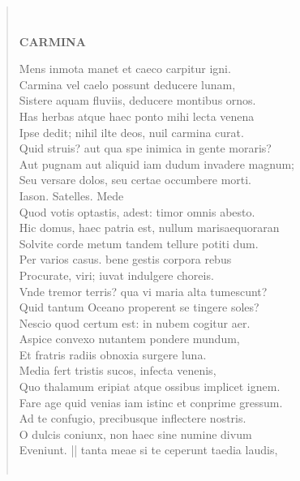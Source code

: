 \documentclass[11pt, a4paper]{report}
\begin{document}
\begin{verse}
        ﻿\pagebreak 
    \begin{center} \textbf{CARMINA} \end{center} \marginpar{[68]} Mens inmota manet et caeco carpitur igni. \\ Carmina vel caelo possunt deducere lunam, \\ Sistere aquam fluviis, deducere montibus ornos. \\ Has herbas atque haec ponto mihi lecta venena \\ Ipse dedit; nihil ilte deos, nuil carmina curat. \\ Quid struis? aut qua spe inimica in gente moraris? \\ Aut pugnam aut aliquid iam dudum invadere magnum; \\ Seu versare dolos, seu certae occumbere morti. \\ Iason. Satelles. Mede \\ Quod votis optastis, adest: timor omnis abesto. \\ Hic domus, haec patria est, nullum marisaequoraran \\ Solvite corde metum tandem tellure potiti  \lbrack dum. \\ Per varios casus. bene gestis corpora rebus \\ Procurate, viri; iuvat indulgere choreis. \\ Vnde tremor terris? qua vi maria alta tumescunt? \\ Quid tantum Oceano properent se tingere soles? \\ Nescio quod certum est: in nubem cogitur aer. \\ Aspice convexo nutantem pondere mundum, \\ Et fratris radiis obnoxia surgere luna. \\ Media fert tristis sucos, infecta venenis, \\ Quo thalamum eripiat atque ossibus implicet ignem. \\ Fare age quid venias iam istinc et conprime gressum. \\ Ad te confugio, precibusque inflectere nostris. \\ O dulcis coniunx, non haec sine numine divum \\ Eveniunt. || tanta meae si te ceperunt taedia laudis, \\ 
        ﻿\pagebreak 

\end{verse}
\end{document}
